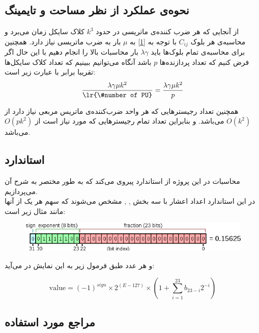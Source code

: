 \documentclass[12pt,onecolumn,a4paper,fleqn]{article}
\begin{document}
\subsection{نحوه‌ی عملکرد از نظر مساحت و تایمینگ}
از آنجایی که هر ضرب کننده‌ی ماتریسی در حدود
 $k^3$
 کلاک سایکل زمان می‌برد و محاسبه‌ی هر بلوک $C_{ij}$ با توجه به
 \autoref{1}
به $\mu$ بار به ضرب ماتریسی نیاز دارد. همچنین برای محاسبه‌ی تمام بلوک‌ها باید $\lambda\gamma$ بار محاسبات بالا را انجام دهیم با این حال اگر فرض کنیم که تعداد پردازنده‌ها $p$ باشد آنگاه می‌توانیم ببینیم که تعداد کلاک‌ سایکل‌ها تقریبا برابر با عبارت زیر است:
\begin{equation}
	\dfrac{\lambda\gamma\mu k^2}{\text{\lr{\#number of PU}}} = 	\dfrac{\lambda\gamma\mu k^2}{p}
\end{equation}

همچنین تعداد رجیستر‌هایی که هر واحد ضرب‌کننده‌ی ماتریس مربعی نیاز دارد از $O(k^2)$ می‌باشد. و بنابراین تعداد تمام رجیستر‌هایی که مورد نیاز است از $O(pk^2)$ می‌باشد.

	\pagebreak

\subsection{استاندارد‌ }
محاسبات در این پروژه از استاندارد
 پیروی می‌کند که به طور مختصر به شرح آن می‌پردازیم. \\
 در این استاندارد اعداد اعشار با سه بخش  ,  ,  مشخص می‌شوند که سهم هر یک از آنها مانند مثال زیر است:
 
\begin{figure}[h]
	\centering
	\includegraphics[width=0.8\linewidth]{source/float_example.png}
\end{figure}

و هر عدد طبق فرمول زیر به این نمایش در می‌آید:

\begin{equation}
\text{value} = (-1)^{sign} \times 2^{(E-127)} \times (1 + \sum_{i=1}^{23}b_{23-i}2^{-i})
\end{equation}
 
 \pagebreak

\subsection{مراجع مورد استفاده}
\end{document}
